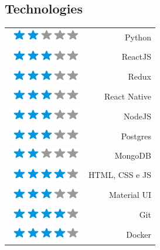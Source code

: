 \documentclass{friggeri-cv}
\begin{document}
\begin{aside}
  \section{Technologies}
  \begin{tabular}{lr}
  \includegraphics[scale=0.3]{img/2stars.png} & Python \\
  \includegraphics[scale=0.3]{img/3stars.png} & ReactJS \\
  \includegraphics[scale=0.3]{img/3stars.png} & Redux \\
  \includegraphics[scale=0.3]{img/3stars.png} & React Native \\
  \includegraphics[scale=0.3]{img/3stars.png} & NodeJS \\
  \includegraphics[scale=0.3]{img/3stars.png} & Postgres \\
  \includegraphics[scale=0.3]{img/2stars.png} & MongoDB \\
  \includegraphics[scale=0.3]{img/4stars.png} & HTML, CSS e JS \\
  \includegraphics[scale=0.3]{img/3stars.png} & Material UI \\
  \includegraphics[scale=0.3]{img/4stars.png} & Git \\
  \includegraphics[scale=0.3]{img/4stars.png} & Docker \\
  \end{tabular}
    ~
\end{aside}
\end{document}
